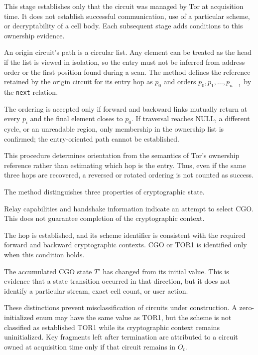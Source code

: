 \documentclass[10pt,a4paper]{article}
\newcommand{\code}[1]{\nolinkurl{#1}}
\newcommand{\torone}{\textsc{TOR1}}
\begin{document}
This stage establishes only that the circuit was managed by Tor at acquisition time. It does not establish successful communication, use of a particular scheme, or decryptability of a cell body. Each subsequent stage adds conditions to this ownership evidence.


An origin circuit's path is a circular list. Any element can be treated as the head if the list is viewed in isolation, so the entry must not be inferred from address order or the first position found during a scan. The method defines the reference retained by the origin circuit for its entry hop as $p_0$ and orders $p_0,p_1,\ldots,p_{n-1}$ by the \code{next} relation.

The ordering is accepted only if forward and backward links mutually return at every $p_i$ and the final element closes to $p_0$. If traversal reaches NULL, a different cycle, or an unreadable region, only membership in the ownership list is confirmed; the entry-oriented path cannot be established.

This procedure determines orientation from the semantics of Tor's ownership reference rather than estimating which hop is the entry. Thus, even if the same three hops are recovered, a reversed or rotated ordering is not counted as success.


The method distinguishes three properties of cryptographic state.

\begin{description}[style=nextline,leftmargin=2.5em]
  \item[Negotiation intent]
  Relay capabilities and handshake information indicate an attempt to select CGO. This does not guarantee completion of the cryptographic context.

  \item[Established cryptographic scheme]
  The hop is established, and its scheme identifier is consistent with the required forward and backward cryptographic contexts. CGO or \torone{} is identified only when this condition holds.

  \item[Update of accumulated CGO state]
  The accumulated CGO state $T'$ has changed from its initial value. This is evidence that a state transition occurred in that direction, but it does not identify a particular stream, exact cell count, or user action.
\end{description}

These distinctions prevent misclassification of circuits under construction. A zero-initialized enum may have the same value as \torone{}, but the scheme is not classified as established \torone{} while its cryptographic context remains uninitialized. Key fragments left after termination are attributed to a circuit owned at acquisition time only if that circuit remains in $O_t$.
\end{document}
